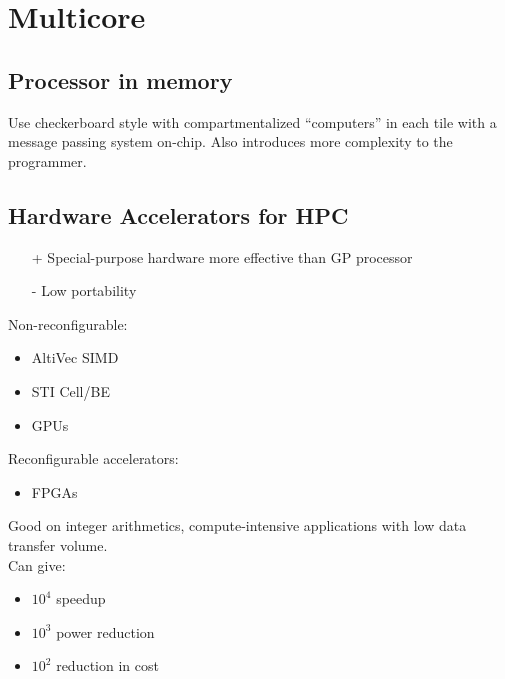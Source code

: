 \documentclass[a4paper]{article}
\begin{document}
\section{Multicore}
\subsection{Processor in memory}
Use checkerboard style with compartmentalized ``computers'' in each tile with a message
passing system on-chip. Also introduces more complexity to the programmer.

\subsection{Hardware Accelerators for HPC}
\begin{itemize}
    \item[+] Special-purpose hardware more effective than GP processor
    \item[-] Low portability
\end{itemize}
Non-reconfigurable:
\begin{itemize}
    \item AltiVec SIMD
    \item STI Cell/BE
    \item GPUs
\end{itemize}

Reconfigurable accelerators:
\begin{itemize}
    \item FPGAs
\end{itemize}
Good on integer arithmetics, compute-intensive applications with low data transfer
volume.\\
Can give:
\begin{itemize}
    \item $10^4$ speedup
    \item $10^3$ power reduction
    \item $10^2$ reduction in cost
\end{itemize}
\end{document}

